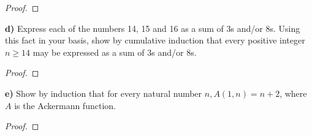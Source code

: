 \documentclass[titlepage, letterpaper, fleqn]{article}
\newcommand{\spacepls}{\vspace{5mm}}
\begin{document}
\begin{proof}
\lipsum[1]
\end{proof}

\spacepls

{\large \textbf{d)} Express each of the numbers 14, 15 and 16 as a sum of 3s and/or 8s. Using this fact in your basis, show by cumulative induction that every positive integer \(n \geq 14\) may be expressed as a sum of 3s and/or 8s}.

\begin{proof}
\lipsum[1]
\end{proof}

\spacepls

{\large \textbf{e)} Show by induction that for every natural number \(n, A(1,n) = n+2\), where \(A\) is the Ackermann function.}

\begin{proof}
\lipsum[1]
\end{proof}
\end{document}
